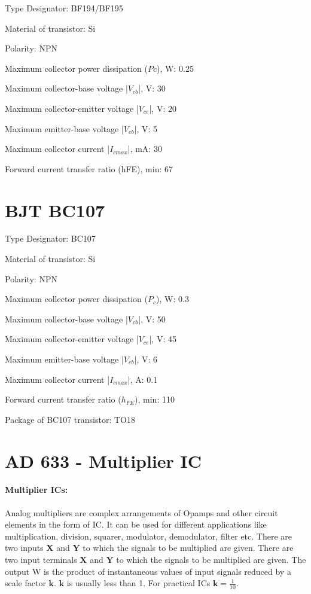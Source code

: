 Type Designator: BF194/BF195

Material of transistor: Si

Polarity: NPN

Maximum collector power dissipation ($Pc$), W: 0.25

Maximum collector-base voltage |$V_{cb}$|, V: 30

Maximum collector-emitter voltage |$V_{ce}$|, V: 20

Maximum emitter-base voltage |$V_{eb}$|, V: 5

Maximum collector current |$I_{c max}$|, mA: 30

Forward current transfer ratio (hFE), min: 67


\section{BJT BC107}
\label{BC107}
Type Designator: BC107

Material of transistor: Si

Polarity: NPN

Maximum collector power dissipation ($P_c$), W: 0.3

Maximum collector-base voltage |$V_{cb}$|, V: 50

Maximum collector-emitter voltage |$V_{ce}$|, V: 45

Maximum emitter-base voltage |$V_{eb}$|, V: 6

Maximum collector current |$I_{cmax}$|, A: 0.1

Forward current transfer ratio ($h_{FE}$), min: 110

Package of BC107 transistor: TO18



\section{AD 633 - Multiplier IC}
\label{AD633}
\paragraph{Multiplier ICs:}
 Analog multipliers are complex arrangements of Opamps and other circuit elements in the form of IC. It can be used for different applications like multiplication, division, squarer, modulator, demodulator, filter etc. There are two inputs $\textbf{X}$ and $\textbf{Y}$ to which the signals to be multiplied are given.
There are two input terminals $\textbf{X}$ and $\textbf{Y}$ to which the signals to be multiplied are given. The output W is the product of instantaneous values of input signals reduced by a scale factor $\textbf{k}$. $\textbf{k}$ is usually less than 1. For practical ICs $\textbf{k}=\frac{1}{10}$.

